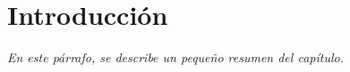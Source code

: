 

\chapter{Introducción} \label{cha:intro}

\begin{fullwidth}
\textit{En este párrafo, se describe un pequeño resumen del capítulo. \lipsum[1]} \newline
\end{fullwidth}



